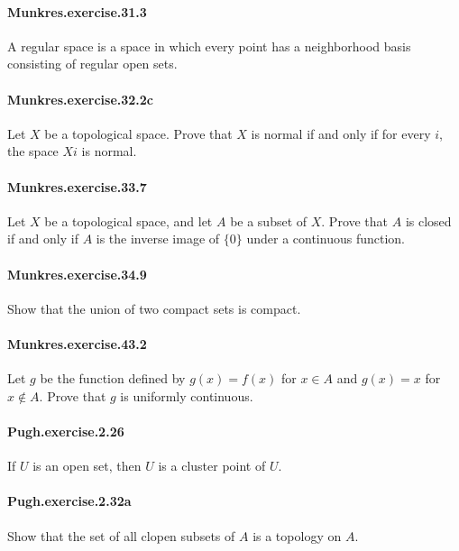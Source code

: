 \documentclass{article}
\begin{document}
\paragraph{Munkres.exercise.31.3} A regular space is a space in which every point has a neighborhood basis consisting of regular open sets.


\paragraph{Munkres.exercise.32.2c} Let $X$ be a topological space. Prove that $X$ is normal if and only if for every $i$, the space $X i$ is normal.

\paragraph{Munkres.exercise.33.7} Let $X$ be a topological space, and let $A$ be a subset of $X$. Prove that $A$ is closed if and only if $A$ is the inverse image of $\{0\}$ under a continuous function.

\paragraph{Munkres.exercise.34.9} Show that the union of two compact sets is compact.

\paragraph{Munkres.exercise.43.2} Let $g$ be the function defined by $g(x)=f(x)$ for $x \in A$ and $g(x)=x$ for $x \notin A$. Prove that $g$ is uniformly continuous.

\paragraph{Pugh.exercise.2.26} If $U$ is an open set, then $U$ is a cluster point of $U$.

\paragraph{Pugh.exercise.2.32a} Show that the set of all clopen subsets of $A$ is a topology on $A$.
\end{document}

